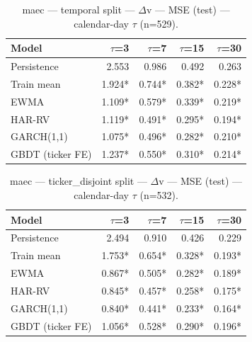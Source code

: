 \begin{table}[t]
\centering
\begin{tabular}{lrrrr}
\toprule
Model & $\tau$=3 & $\tau$=7 & $\tau$=15 & $\tau$=30 \\
\midrule
Persistence & 2.553 & 0.986 & 0.492 & 0.263 \\
Train mean & 1.924* & 0.744* & 0.382* & 0.228* \\
EWMA & 1.109* & 0.579* & 0.339* & 0.219* \\
HAR-RV & 1.119* & 0.491* & 0.295* & 0.194* \\
GARCH(1,1) & 1.075* & 0.496* & 0.282* & 0.210* \\
GBDT (ticker FE) & 1.237* & 0.550* & 0.310* & 0.214* \\
\bottomrule
\end{tabular}
\caption{maec — temporal split — $\Delta$v — MSE (test) — calendar-day $\tau$ (n=529).}
\end{table}

\begin{table}[t]
\centering
\begin{tabular}{lrrrr}
\toprule
Model & $\tau$=3 & $\tau$=7 & $\tau$=15 & $\tau$=30 \\
\midrule
Persistence & 2.494 & 0.910 & 0.426 & 0.229 \\
Train mean & 1.753* & 0.654* & 0.328* & 0.193* \\
EWMA & 0.867* & 0.505* & 0.282* & 0.189* \\
HAR-RV & 0.845* & 0.457* & 0.258* & 0.175* \\
GARCH(1,1) & 0.840* & 0.441* & 0.233* & 0.164* \\
GBDT (ticker FE) & 1.056* & 0.528* & 0.290* & 0.196* \\
\bottomrule
\end{tabular}
\caption{maec — ticker\_disjoint split — $\Delta$v — MSE (test) — calendar-day $\tau$ (n=532).}
\end{table}
